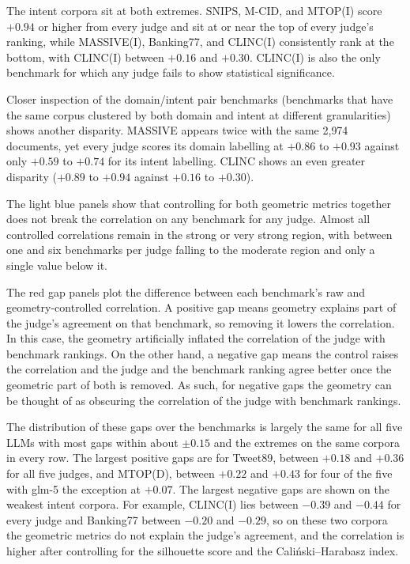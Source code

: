 \documentclass[11pt,a4paper,oneside]{report}
\begin{document}
The intent corpora sit at both extremes. SNIPS, M-CID, and MTOP(I) score $+0.94$ or higher from every judge and sit at or near the top of every judge's ranking, while MASSIVE(I), Banking77, and CLINC(I) consistently rank at the bottom, with CLINC(I) between $+0.16$ and $+0.30$. CLINC(I) is also the only benchmark for which any judge fails to show statistical significance.

Closer inspection of the domain/intent pair benchmarks (benchmarks that have the same corpus clustered by both domain and intent at different granularities) shows another disparity. MASSIVE appears twice with the same 2{,}974 documents, yet every judge scores its domain labelling at $+0.86$ to $+0.93$ against only $+0.59$ to $+0.74$ for its intent labelling. CLINC shows an even greater disparity ($+0.89$ to $+0.94$ against $+0.16$ to $+0.30$).

The light blue panels show that controlling for both geometric metrics together does not break the correlation on any benchmark for any judge. Almost all controlled correlations remain in the strong or very strong region, with between one and six benchmarks per judge falling to the moderate region and only a single value below it.

The red gap panels plot the difference between each benchmark's raw and geometry-controlled correlation. A positive gap means geometry explains part of the judge's agreement on that benchmark, so removing it lowers the correlation. In this case, the geometry artificially inflated the correlation of the judge with benchmark rankings. On the other hand, a negative gap means the control raises the correlation and the judge and the benchmark ranking agree better once the geometric part of both is removed. As such, for negative gaps the geometry can be thought of as obscuring the correlation of the judge with benchmark rankings.

The distribution of these gaps over the benchmarks is largely the same for all five LLMs with most gaps within about $\pm 0.15$ and the extremes on the same corpora in every row. The largest positive gaps are for Tweet89, between $+0.18$ and $+0.36$ for all five judges, and MTOP(D), between $+0.22$ and $+0.43$ for four of the five with {\small\ttfamily glm-5} the exception at $+0.07$. The largest negative gaps are shown on the weakest intent corpora. For example, CLINC(I) lies between $-0.39$ and $-0.44$ for every judge and Banking77 between $-0.20$ and $-0.29$, so on these two corpora the geometric metrics do not explain the judge's agreement, and the correlation is higher after controlling for the silhouette score and the Cali\'nski--Harabasz index.
\end{document}
